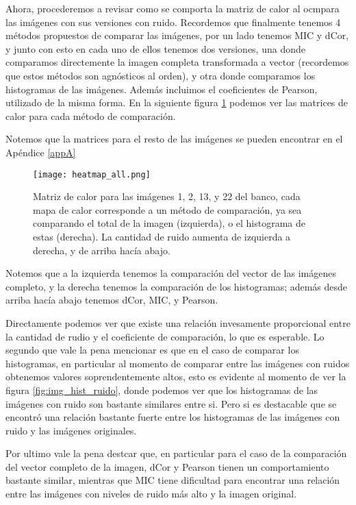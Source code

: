 Ahora, procederemos a revisar como se comporta la matriz de calor al ocmpara las im\'agenes con sus versiones con ruido. Recordemos que finalmente tenemos 4 m\'etodos propuestos de comparar las im\'agenes, por un lado tenemos MIC y dCor, y junto con esto en cada uno de ellos tenemos dos versiones, una donde comparamos directemente la imagen completa transformada a vector (recordemos que estos m\'etodos son agn\'osticos al orden), y otra donde comparamos los histogramas de las im\'agenes. Adem\'as incluimos el coeficientes de Pearson, utilizado de la misma forma. En la siguiente figura \ref{fig:heatmapall} podemos ver las matrices de calor para cada m\'etodo de comparaci\'on.

Notemos que la matrices para el resto de las im\'agenes se pueden encontrar en el Ap\'endice \ref{appA}

\begin{figure}[H]
    \centering
    \texttt{[image: heatmap\_all.png]}
    \caption{Matriz de calor para las im\'agenes 1, 2, 13, y 22 del banco, cada mapa de calor corresponde a un m\'etodo de comparaci\'on, ya sea comparando el total de la imagen (izquierda), o el histograma de estas (derecha). La cantidad de ruido aumenta de izquierda a derecha, y de arriba hacía abajo.}
    \label{fig:heatmapall}
\end{figure}

Notemos que a la izquierda tenemos la comparaci\'on del vector de las im\'agenes completo, y la derecha tenemos la comparaci\'on de los histogramas; además desde arriba hac\'ia abajo tenemos dCor, MIC, y Pearson.

Directamente podemos ver que existe una relaci\'on invesamente proporcional entre la cantidad de rudio y el coeficiente de comparaci\'on, lo que es esperable. Lo segundo que vale la pena mencionar es que en el caso de comparar los histogramas, en particular al momento de comparar entre las im\'agenes con ruidos obtenemos valores soprendentemente altos, esto es evidente al momento de ver la figura \ref{fig:img_hist_ruido}, donde podemos ver que los histogramas de las im\'agenes con ruido son bastante similares entre si. Pero si es destacable que se encontró una relaci\'on bastante fuerte entre los histogramas de las im\'agenes con ruido y las im\'agenes originales. 


Por ultimo vale la pena destcar que, en particular para el caso de la comparaci\'on del vector completo de la imagen, dCor y Pearson tienen un comportamiento bastante similar, mientras que MIC tiene dificultad para encontrar una relaci\'on entre las im\'agenes con niveles de ruido m\'as alto y la imagen original. 
